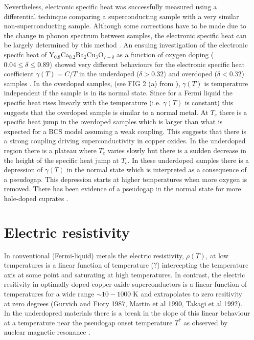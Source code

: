 Nevertheless, electronic specific heat was successfully measured using a differential techinque comparing a superconducting sample with a very similar non-superconducting sample. 
Although some corrections have to be made due to the change in phonon spectrum between samples, the electronic specific heat can be largely determined by this method \cite{Loram1990,Loram1993, Loram1994}.
An ensuing investigation of the electronic specifc heat of Y$_{0.8}$Ca$_{0.2}$Ba$_2$Cu$_3$O$_{7-\delta}$ as a function of oxygen doping ($0.04\leq \delta \leq 0.89$) showed very different behaviours for the electronic specific heat coefficient $\gamma (T) = C/T$ in the underdoped ($\delta > 0.32$) and overdoped ($\delta < 0.32$) samples \cite{Loram1997}.
In the overdoped samples, (see FIG 2 (a) from \cite{Loram1997}), $\gamma (T)$ is temperature independent if the sample is in its normal state.
Since for a Fermi liquid the specific heat rises linearly with the temperature (i.e. $\gamma (T)$ is constant) this suggests that the overdoped sample is similar to a normal metal. 
At $T_c$ there is a specific heat jump in the overdoped samples which is larger than what is expected for a BCS model assuming a weak coupling.
This suggests that there is a strong coupling driving superconductivity in copper oxides.
In the underdoped region there is a plateau where $T_c$ varies slowly but there is a sudden decrease in the height of the specific heat jump at $T_c$.
In these underdoped samples there is a depression of $\gamma (T)$ in the normal state which is interpreted as a consequence of a pseudogap. 
This depression starts at higher temperatures when more oxygen is removed.
There has been evidence of a pseudogap in the normal state for more hole-doped cuprates \cite{Loram2001}.

\section{Electric resistivity}
\label{sec:resistivity}

In conventional (Fermi-liquid) metals the electric resistivity, $\rho(T)$, at low temperatures is a linear function of temperature (?) intercepting the temperature axis at some point and saturating at high temperatures.
In contrast, the electric resitivity in optimally doped copper oxide superconductors is a linear function of temperatures for a wide range $\sim 10-1000$ K and extrapolates to zero resitivity at zero degrees \cite{?}(Gurvich and Fiory 1987, Martin et al 1990, Takagi et al 1992).
In the underdopred materials there is a break in the slope of this linear behaviour at a temperature near the pseudogap onset temperature $T^*$ as observed by nuclear magnetic resonance \cite{Bucher1993}.

